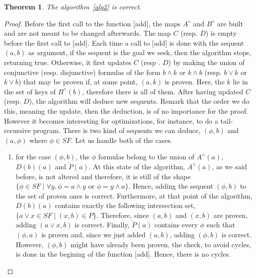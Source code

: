 \documentclass[a4paper, 11pt]{article}
\newtheorem{theorem}{Theorem}
\begin{document}
    \begin{theorem}
	    The algorithm~\ref{alg2} is correct.
    \end{theorem}
    \begin{proof}
	    Before the first call to the function [add], the maps $A^\diamond$ and $B^\diamond$
	    are built and are not meant to be changed afterwards. The map $C$ (resp. $D$) is empty 
	    before the
	    first call to [add]. Each time a call to [add] is done with the sequent $(a,b)$ as argument,
	    if the sequent is the goal we seek, then the algorithm stops, returning true. Otherwise,
	    it first updates $C$ (resp . $D$) by making the union of conjunctive (resp. disjunctive) 
	    formulas of the form $b\wedge k$ or $k\wedge b$ (resp. $b\vee k$ or $k\vee b$) that may be 
	    proven if, at some point, $(a,k)$ is proven. Here, the $k$ lie in
	    the set of keys of $B^\wedge(b)$, therefore there is all of them. After having updated $C$
	    (resp. $D$),
	    the algorithm will deduce new sequents. Remark that the order we do this, meaning the
	    update, then the deduction, is of no importance for the proof. However it becomes 
	    interesting for
	    optimizations, for instance, to do a tail-recursive program. There is two kind of sequents
	    we can deduce, $(\phi,b)$ and $(a,\phi)$ where $\phi\in SF$. Let us handle both of the cases.
	    \begin{enumerate}
		    \item
			    for the case $(\phi,b)$, the $\phi$ formulas belong to the union of 
			    $A^\wedge(a)$, $D(b)(a)$ and $\overleftarrow{P}(a)$. At this state of the 
			    algorithm, $A^\wedge(a)$,
			    as we said before, is not altered and therefore, it is still of the shape
			    $\{\phi\in SF\mid\forall y,\phi=a\wedge y\text{ or }\phi=y\wedge a\}$. Hence,
			    adding the sequent $(\phi,b)$ to the set of proven ones is correct.
			    Furthermore, at that point of the algorithm, $D(b)(a)$ contains exactly the 
			    following intersection set, $\{a\vee x\in SF\mid(x,b)\in P\}$. Therefore,
			    since $(a,b)$ and $(x,b)$ are proven, adding $(a\vee x,b)$ is correct.
			    Finally, $\overleftarrow{P}(a)$ contains every $\phi$ such that $(\phi,a)$
			    is proven and, since we just added $(a,b)$, adding $(\phi,b)$ is correct.
			    However, $(\phi,b)$ might have already been proven, the check, to avoid
			    cycles, is done in the begining of the function [add]. Hence, there is
			    no cycles.

\end{enumerate}
\end{proof}
\end{document}
